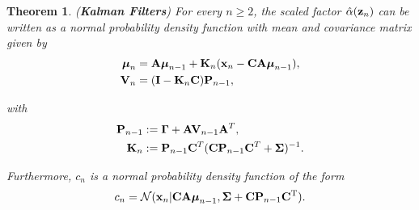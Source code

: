 \documentclass[11pt]{article}
\numberwithin{equation}{section}
\newcommand{\x}{{\bf x}}
\newcommand{\z}{{\bf z}}
\newcommand{\N}{\mathcal{N}}
\newtheorem{theorem}{Theorem}[section]
\begin{document}
\begin{theorem} \label{thorem:alpha-forward-equations-n}
	(\textbf{Kalman Filters}) For every $n \geq 2$, the scaled factor $\hat\alpha(\z_n)$ can be written as a normal probability density function with mean and covariance matrix given by
	\begin{align}
		\boldsymbol{\mu}_n &= {\bf A}\boldsymbol{\mu}_{n-1} + {\bf K}_n(\x_n -{\bf C}{\bf A}\boldsymbol\mu_{n-1}),\\
		{\bf V}_n &=  ({\bf I} - {\bf K}_n{\bf C}){\bf P}_{n-1},
	\end{align}
	
	with
	\begin{align}
		{\bf P}_{n-1} &:= \boldsymbol{\Gamma} + {\bf A}{\bf V}_{n-1}{\bf A}^T,\\
		{\bf K}_n &:= {\bf P}_{n-1}{\bf C}^T({\bf C} {\bf P}_{n-1}{\bf C}^T + \boldsymbol\Sigma)^{-1}.
	\end{align}
	
	Furthermore, $c_n$ is a normal probability density function of the form
	\begin{equation}
		c_n = \N(\x_n \vert {\bf CA}\boldsymbol\mu_{n-1}, \boldsymbol\Sigma + {\bf C P}_{n-1}{\bf C}^\text{T}).
	\end{equation}
\end{theorem}
\end{document}
